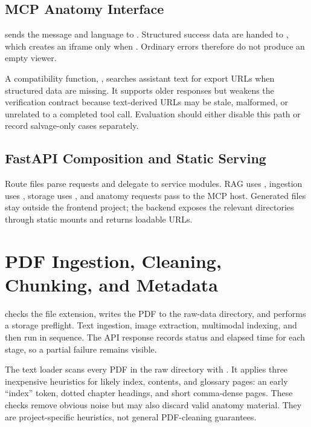 \subsection{MCP Anatomy Interface}
\label{subsec:mcp-ui}

 sends the message and language to . Structured success data are handed to , which creates an iframe only when . Ordinary errors therefore do not produce an empty viewer.

A compatibility function, , searches assistant text for export URLs when structured data are missing. It supports older responses but weakens the verification contract because text-derived URLs may be stale, malformed, or unrelated to a completed tool call. Evaluation should either disable this path or record salvage-only cases separately.

\subsection{FastAPI Composition and Static Serving}
\label{subsec:fastapi-composition}

Route files parse requests and delegate to service modules. RAG uses , ingestion uses , storage uses , and anatomy requests pass to the MCP host. Generated files stay outside the frontend project; the backend exposes the relevant directories through static mounts and returns loadable URLs.

\section{PDF Ingestion, Cleaning, Chunking, and Metadata}
\label{sec:pdf-ingestion}

 checks the file extension, writes the PDF to the raw-data directory, and performs a storage preflight. Text ingestion, image extraction, multimodal indexing, and  then run in sequence. The API response records status and elapsed time for each stage, so a partial failure remains visible.

The text loader scans every PDF in the raw directory with . It applies three inexpensive heuristics for likely index, contents, and glossary pages: an early ``index'' token, dotted chapter headings, and short comma-dense pages. These checks remove obvious noise but may also discard valid anatomy material. They are project-specific heuristics, not general PDF-cleaning guarantees.

